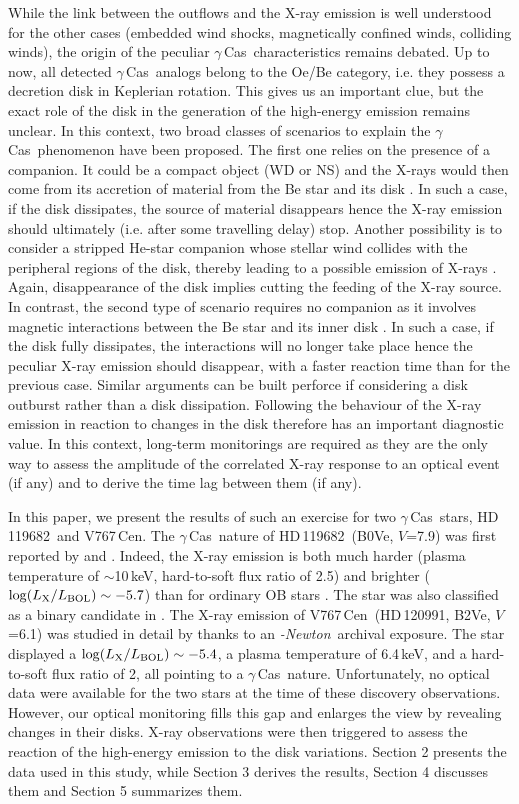 \documentclass[a4paper,fleqn,usenatbib]{mnras}
\newcommand{\xmm}{{\sc{XMM}}\emph{-Newton}}
\newcommand{\gc}{$\gamma$\,Cas}
\newcommand{\hd}{HD\,119682}
\newcommand{\vc}{V767\,Cen}
\begin{document}
While the link between the outflows and the X-ray emission is well understood for the other cases (embedded wind shocks, magnetically confined winds, colliding winds), the origin of the peculiar \gc\ characteristics remains debated. Up to now, all detected \gc\ analogs belong to the Oe/Be category, i.e. they possess a decretion disk in Keplerian rotation. This gives us an important clue, but the exact role of the disk in the generation of the high-energy emission remains unclear. In this context, two broad classes of scenarios to explain the \gc\ phenomenon have been proposed. The first one relies on the presence of a companion. It could be a compact object (WD or NS) and the X-rays would then come from its accretion of material from the Be star and its disk \citep{mur86,pos17}. In such a case, if the disk dissipates, the source of material disappears hence the X-ray emission should ultimately (i.e. after some travelling delay) stop. Another possibility is to consider a stripped He-star companion whose stellar wind collides with the peripheral regions of the disk, thereby leading to a possible emission of X-rays \citep{lan20}. Again, disappearance of the disk implies cutting the feeding of the X-ray source. In contrast, the second type of scenario requires no companion as it involves magnetic interactions between the Be star and its inner disk \citep{rob02,mot15}. In such a case, if the disk fully dissipates, the interactions will no longer take place hence the peculiar X-ray emission should disappear, with a faster reaction time than for the previous case. Similar arguments can be built perforce if considering a disk outburst rather than a disk dissipation. Following the behaviour of the X-ray emission in reaction to changes in the disk therefore has an important diagnostic value. In this context, long-term monitorings are required as they are the only way to assess the amplitude of the correlated X-ray response to an optical event (if any) and to derive the time lag between them (if any). 

In this paper, we present the results of such an exercise for two \gc\ stars, \hd\ and \vc. The \gc\ nature of \hd\ (B0Ve, $V$=7.9) was first reported by \citet{rak06} and \citet{saf07}. Indeed, the X-ray emission is both much harder (plasma temperature of $\sim$10\,keV, hard-to-soft flux ratio of 2.5) and brighter ($\log(L_{\rm X}/L_{\rm BOL})\sim -5.7$) than for ordinary OB stars \citep{naz18}. The star was also classified as a binary candidate in \citet{naz21}. The X-ray emission of \vc\ (HD\,120991, B2Ve, $V$=6.1) was studied in detail by \citet{naz18} thanks to an \xmm\ archival exposure. The star displayed a $\log(L_{\rm X}/L_{\rm BOL})\sim -5.4$, a plasma temperature of 6.4\,keV, and a hard-to-soft flux ratio of 2, all pointing to a \gc\ nature. Unfortunately, no optical data were available for the two stars at the time of these discovery observations. However, our optical monitoring fills this gap and enlarges the view by revealing changes in their disks. X-ray observations were then triggered to assess the reaction of the high-energy emission to the disk variations. Section 2 presents the data used in this study, while Section 3 derives the results, Section 4 discusses them and Section 5 summarizes them. 
\end{document}
